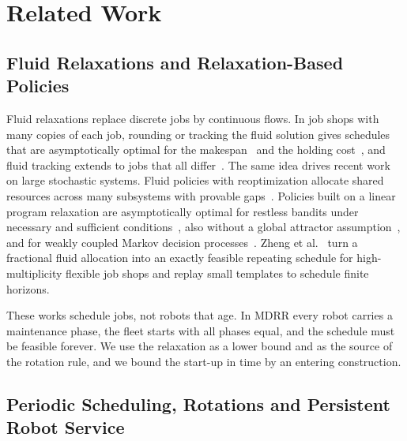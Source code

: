 \section{Related Work}
\label{sec:related}


\subsection{Fluid Relaxations and Relaxation-Based Policies}

Fluid relaxations replace discrete jobs by continuous flows.
In job shops with many copies of each job, rounding or tracking the fluid solution gives schedules that are asymptotically optimal for the makespan~\cite{bertsimas2002fluid} and the holding cost~\cite{bertsimas2003fluid}, and fluid tracking extends to jobs that all differ~\cite{nazarathy2010fluid}.
The same idea drives recent work on large stochastic systems.
Fluid policies with reoptimization allocate shared resources across many subsystems with provable gaps~\cite{brown2025fluid}.
Policies built on a linear program relaxation are asymptotically optimal for restless bandits under necessary and sufficient conditions~\cite{gast2024lp}, also without a global attractor assumption~\cite{hong2023restless}, and for weakly coupled Markov decision processes~\cite{goldsztajn2026weakly}.
Zheng et al.~\cite{zheng2026highmultiplicity} turn a fractional fluid allocation into an exactly feasible repeating schedule for high-multiplicity flexible job shops and replay small templates to schedule finite horizons.

These works schedule jobs, not robots that age.
In MDRR every robot carries a maintenance phase, the fleet starts with all phases equal, and the schedule must be feasible forever.
We use the relaxation as a lower bound and as the source of the rotation rule, and we bound the start-up in time by an entering construction.

\subsection{Periodic Scheduling, Rotations and Persistent Robot Service}

